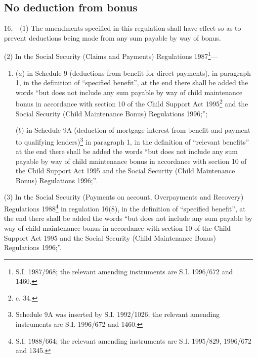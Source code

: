\documentclass[12pt,a4paper]{article}
\begin{document}
\subsection[16. No deduction from bonus]{No deduction from bonus}

16.—(1) The amendments specified in this regulation shall have effect so as to prevent deductions being made from any sum payable by way of bonus.

(2) In the Social Security (Claims and Payments) Regulations 1987\footnote{\frenchspacing S.I. 1987/968; the relevant amending instruments are S.I. 1996/672 and 1460.}—
\begin{enumerate}\item[]
($a$) in Schedule 9 (deductions from benefit for direct payments), in paragraph 1, in the definition of “specified benefit”, at the end there shall be added the words “but does not include any sum payable by way of child maintenance bonus in accordance with section 10 of the Child Support Act 1995\footnote{ c. 34.} and the 
Social Security (Child Maintenance Bonus)  %
Regulations 1996;”;

($b$) in Schedule 9A (deduction of mortgage interest from benefit and payment to qualifying lenders)\footnote{\frenchspacing Schedule 9A was inserted by S.I. 1992/1026; the relevant amending instruments are S.I. 1996/672 and 1460.} in paragraph 1, in the definition of “relevant benefits” at the end there shall be added the words “but does not include any sum payable by way of child maintenance bonus in accordance with section 10 of the Child Support Act 1995 and the 
Social Security (Child Maintenance Bonus)  %
Regulations 1996;”.
\end{enumerate}

(3) In the Social Security (Payments on account, Overpayments and Recovery) Regulations 1988\footnote{\frenchspacing S.I. 1988/664; the relevant amending instruments are S.I. 1995/829, 1996/672 and 1345.} in regulation 16(8), in the definition of “specified benefit”, at the end there shall be added the words “but does not include any sum payable by way of child maintenance bonus in accordance with section 10 of the Child Support Act 1995 and the 
Social Security (Child Maintenance Bonus)  %
Regulations 1996;”.
\end{document}
